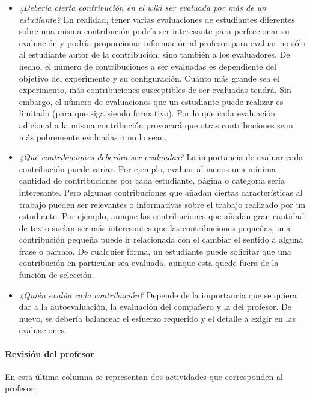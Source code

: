 \begin{itemize}
\item \emph{¿Debería cierta contribución en el wiki ser evaluada por más de un estudiante?} En realidad, tener varias evaluaciones de estudiantes diferentes sobre una misma contribución podría ser interesante para perfeccionar su evaluación y podría proporcionar información al profesor para evaluar no sólo al estudiante autor de la contribución, sino también a los evaluadores. De hecho, el número de contribuciones a ser evaluadas es dependiente del objetivo del experimento y su configuración. Cuánto más grande sea el experimento, más contribuciones susceptibles de ser evaluadas tendrá. Sin embargo, el número de evaluaciones que un estudiante puede realizar es limitado (para que siga siendo formativo). Por lo que cada evaluación adicional a la misma contribución provocará que otras contribuciones sean más pobremente evaluadas o no lo sean.
\item \emph{¿Qué contribuciones deberían ser evaluadas?} La importancia de evaluar cada contribución puede variar. Por ejemplo, evaluar al menos una mínima cantidad de contribuciones por cada estudiante, página o categoría sería interesante. Pero algunas contribuciones que añadan ciertas características al trabajo pueden ser relevantes o informativas sobre el trabajo realizado por un estudiante. Por ejemplo, aunque las contribuciones que añadan gran cantidad de texto suelan ser más interesantes que las contribuciones pequeñas, una contribución pequeña puede ir relacionada con el cambiar el sentido a alguna frase o párrafo. De cualquier forma, un estudiante puede solicitar que una contribución en particular sea evaluada, aunque esta quede fuera de la función de selección.
\item \emph{¿Quién evalúa cada contribución?} Depende de la importancia que se quiera dar a la autoevaluación, la evaluación del compañero y la del profesor. De nuevo, se debería balancear el esfuerzo requerido y el detalle a exigir en las evaluaciones.
\end{itemize}


\paragraph*{Revisión del profesor}

En esta última columna se representan dos actividades que corresponden al profesor:

